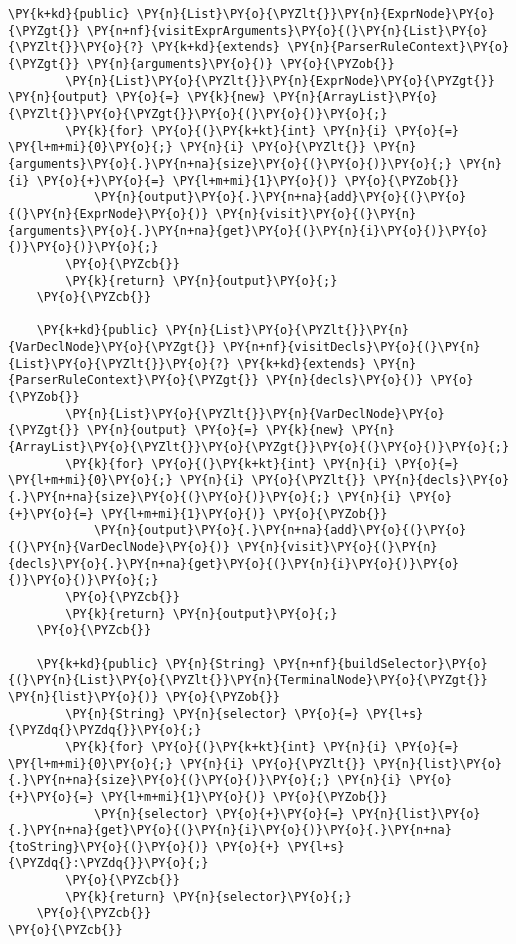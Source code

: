 \begin{Verbatim}[commandchars=\\\{\}]
    \PY{k+kd}{public} \PY{n}{List}\PY{o}{\PYZlt{}}\PY{n}{ExprNode}\PY{o}{\PYZgt{}} \PY{n+nf}{visitExprArguments}\PY{o}{(}\PY{n}{List}\PY{o}{\PYZlt{}}\PY{o}{?} \PY{k+kd}{extends} \PY{n}{ParserRuleContext}\PY{o}{\PYZgt{}} \PY{n}{arguments}\PY{o}{)} \PY{o}{\PYZob{}}
        \PY{n}{List}\PY{o}{\PYZlt{}}\PY{n}{ExprNode}\PY{o}{\PYZgt{}} \PY{n}{output} \PY{o}{=} \PY{k}{new} \PY{n}{ArrayList}\PY{o}{\PYZlt{}}\PY{o}{\PYZgt{}}\PY{o}{(}\PY{o}{)}\PY{o}{;}
        \PY{k}{for} \PY{o}{(}\PY{k+kt}{int} \PY{n}{i} \PY{o}{=} \PY{l+m+mi}{0}\PY{o}{;} \PY{n}{i} \PY{o}{\PYZlt{}} \PY{n}{arguments}\PY{o}{.}\PY{n+na}{size}\PY{o}{(}\PY{o}{)}\PY{o}{;} \PY{n}{i} \PY{o}{+}\PY{o}{=} \PY{l+m+mi}{1}\PY{o}{)} \PY{o}{\PYZob{}}
            \PY{n}{output}\PY{o}{.}\PY{n+na}{add}\PY{o}{(}\PY{o}{(}\PY{n}{ExprNode}\PY{o}{)} \PY{n}{visit}\PY{o}{(}\PY{n}{arguments}\PY{o}{.}\PY{n+na}{get}\PY{o}{(}\PY{n}{i}\PY{o}{)}\PY{o}{)}\PY{o}{)}\PY{o}{;}
        \PY{o}{\PYZcb{}}
        \PY{k}{return} \PY{n}{output}\PY{o}{;}
    \PY{o}{\PYZcb{}}
    
    \PY{k+kd}{public} \PY{n}{List}\PY{o}{\PYZlt{}}\PY{n}{VarDeclNode}\PY{o}{\PYZgt{}} \PY{n+nf}{visitDecls}\PY{o}{(}\PY{n}{List}\PY{o}{\PYZlt{}}\PY{o}{?} \PY{k+kd}{extends} \PY{n}{ParserRuleContext}\PY{o}{\PYZgt{}} \PY{n}{decls}\PY{o}{)} \PY{o}{\PYZob{}}
        \PY{n}{List}\PY{o}{\PYZlt{}}\PY{n}{VarDeclNode}\PY{o}{\PYZgt{}} \PY{n}{output} \PY{o}{=} \PY{k}{new} \PY{n}{ArrayList}\PY{o}{\PYZlt{}}\PY{o}{\PYZgt{}}\PY{o}{(}\PY{o}{)}\PY{o}{;}
        \PY{k}{for} \PY{o}{(}\PY{k+kt}{int} \PY{n}{i} \PY{o}{=} \PY{l+m+mi}{0}\PY{o}{;} \PY{n}{i} \PY{o}{\PYZlt{}} \PY{n}{decls}\PY{o}{.}\PY{n+na}{size}\PY{o}{(}\PY{o}{)}\PY{o}{;} \PY{n}{i} \PY{o}{+}\PY{o}{=} \PY{l+m+mi}{1}\PY{o}{)} \PY{o}{\PYZob{}}
            \PY{n}{output}\PY{o}{.}\PY{n+na}{add}\PY{o}{(}\PY{o}{(}\PY{n}{VarDeclNode}\PY{o}{)} \PY{n}{visit}\PY{o}{(}\PY{n}{decls}\PY{o}{.}\PY{n+na}{get}\PY{o}{(}\PY{n}{i}\PY{o}{)}\PY{o}{)}\PY{o}{)}\PY{o}{;}
        \PY{o}{\PYZcb{}}
        \PY{k}{return} \PY{n}{output}\PY{o}{;}
    \PY{o}{\PYZcb{}}
    
    \PY{k+kd}{public} \PY{n}{String} \PY{n+nf}{buildSelector}\PY{o}{(}\PY{n}{List}\PY{o}{\PYZlt{}}\PY{n}{TerminalNode}\PY{o}{\PYZgt{}} \PY{n}{list}\PY{o}{)} \PY{o}{\PYZob{}}
        \PY{n}{String} \PY{n}{selector} \PY{o}{=} \PY{l+s}{\PYZdq{}\PYZdq{}}\PY{o}{;}
        \PY{k}{for} \PY{o}{(}\PY{k+kt}{int} \PY{n}{i} \PY{o}{=} \PY{l+m+mi}{0}\PY{o}{;} \PY{n}{i} \PY{o}{\PYZlt{}} \PY{n}{list}\PY{o}{.}\PY{n+na}{size}\PY{o}{(}\PY{o}{)}\PY{o}{;} \PY{n}{i} \PY{o}{+}\PY{o}{=} \PY{l+m+mi}{1}\PY{o}{)} \PY{o}{\PYZob{}}
            \PY{n}{selector} \PY{o}{+}\PY{o}{=} \PY{n}{list}\PY{o}{.}\PY{n+na}{get}\PY{o}{(}\PY{n}{i}\PY{o}{)}\PY{o}{.}\PY{n+na}{toString}\PY{o}{(}\PY{o}{)} \PY{o}{+} \PY{l+s}{\PYZdq{}:\PYZdq{}}\PY{o}{;}
        \PY{o}{\PYZcb{}}
        \PY{k}{return} \PY{n}{selector}\PY{o}{;}
    \PY{o}{\PYZcb{}}
\PY{o}{\PYZcb{}}
\end{Verbatim}
